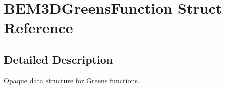\section{B\+E\+M3\+D\+Greens\+Function Struct Reference}
\label{structBEM3DGreensFunction}


\subsection{Detailed Description}
Opaque data structure for Green\textquotesingle{}s functions. 